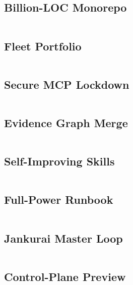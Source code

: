 \documentclass[conference]{IEEEtran}
\begin{document}
\subsection{Billion-LOC Monorepo}
\inputminted{yaml}{listings/billion-loc-monorepo.zyal}

\subsection{Fleet Portfolio}
\inputminted{yaml}{listings/fleet-portfolio.zyal}

\subsection{Secure MCP Lockdown}
\inputminted{yaml}{listings/secure-mcp-lockdown.zyal}

\subsection{Evidence Graph Merge}
\inputminted{yaml}{listings/evidence-graph-merge.zyal}

\subsection{Self-Improving Skills}
\inputminted{yaml}{listings/self-improving-skills.zyal}

\subsection{Full-Power Runbook}
\inputminted{yaml}{listings/full-power-runbook.zyal}

\subsection{Jankurai Master Loop}
\inputminted{yaml}{listings/jankurai-master-loop.zyal}

\subsection{Control-Plane Preview}
\inputminted{yaml}{listings/control-plane-preview.zyal}

\balance


\end{document}
